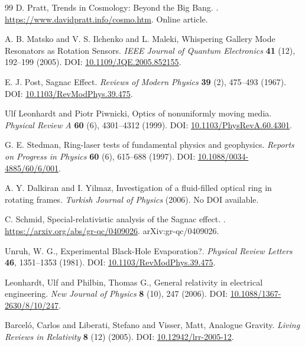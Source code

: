 \documentclass[a4paper, aps,preprint,superscriptaddress, 12pt]{revtex4}
\begin{document}
\begin{thebibliography}{99}
D. Pratt,
\newblock Trends in Cosmology: Beyond the Big Bang.
.
\newblock \url{https://www.davidpratt.info/cosmo.htm}.
\newblock Online article.


A. B. Matsko and V. S. Ilchenko and L. Maleki,
\newblock Whispering Gallery Mode Resonators as Rotation Sensors.
\textit{IEEE Journal of Quantum Electronics} \textbf{41} (12), 192–199 (2005).
\newblock DOI: \href{https://doi.org/10.1109/JQE.2005.852155}{10.1109/JQE.2005.852155}.


E. J. Post,
\newblock Sagnac Effect.
\textit{Reviews of Modern Physics} \textbf{39} (2), 475--493 (1967).
\newblock DOI: \href{https://doi.org/10.1103/RevModPhys.39.475}{10.1103/RevModPhys.39.475}.


Ulf Leonhardt and Piotr Piwnicki,
\newblock Optics of nonuniformly moving media.
\textit{Physical Review A} \textbf{60} (6), 4301--4312 (1999).
\newblock DOI: \href{https://doi.org/10.1103/PhysRevA.60.4301}{10.1103/PhysRevA.60.4301}.


G. E. Stedman,
\newblock Ring-laser tests of fundamental physics and geophysics.
\textit{Reports on Progress in Physics} \textbf{60} (6), 615--688 (1997).
\newblock DOI: \href{https://doi.org/10.1088/0034-4885/60/6/001}{10.1088/0034-4885/60/6/001}.


A. Y. Dalkiran and I. Yilmaz,
\newblock Investigation of a fluid-filled optical ring in rotating frames.
\textit{Turkish Journal of Physics} (2006).
\newblock No DOI available.


C. Schmid,
\newblock Special-relativistic analysis of the Sagnac effect.
.
\newblock \url{https://arxiv.org/abs/gr-qc/0409026}.
\newblock arXiv:gr-qc/0409026.


Unruh, W. G.,
\newblock Experimental Black-Hole Evaporation?.
\textit{Physical Review Letters} \textbf{46}, 1351--1353 (1981).
\newblock DOI: \href{https://doi.org/10.1103/RevModPhys.39.475}{10.1103/RevModPhys.39.475}.


Leonhardt, Ulf and Philbin, Thomas G.,
\newblock General relativity in electrical engineering.
\textit{New Journal of Physics} \textbf{8} (10), 247 (2006).
\newblock DOI: \href{https://doi.org/10.1088/1367-2630/8/10/247}{10.1088/1367-2630/8/10/247}.


Barceló, Carlos and Liberati, Stefano and Visser, Matt,
\newblock Analogue Gravity.
\textit{Living Reviews in Relativity} \textbf{8} (12) (2005).
\newblock DOI: \href{https://doi.org/10.12942/lrr-2005-12}{10.12942/lrr-2005-12}.



\end{thebibliography}
\end{document}
